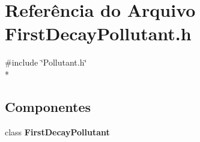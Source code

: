 \section{Referência do Arquivo First\+Decay\+Pollutant.\+h}
\label{_first_decay_pollutant_8h}
{\ttfamily \#include \char`\"{}Pollutant.\+h\char`\"{}}\\*
\subsection*{Componentes}
\begin{DoxyCompactItemize}
\item 
class {\bf First\+Decay\+Pollutant}
\end{DoxyCompactItemize}
